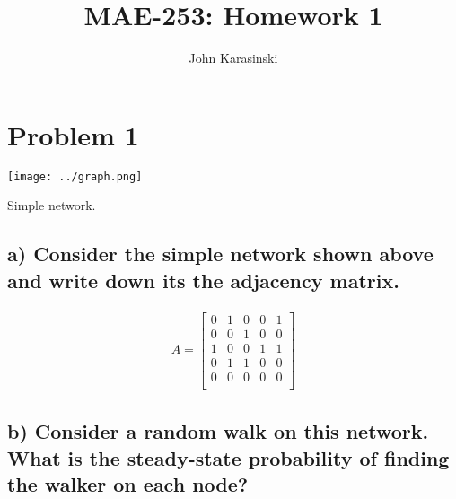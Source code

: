 \documentclass{tufte-handout}
\begin{document}
\title{MAE-253: Homework 1}
\author[John Karasinski]{John Karasinski}
\maketitle%

\section{Problem 1}

\begin{marginfigure}%
  \texttt{[image: ../graph.png]}
  \caption{Simple network.}
\end{marginfigure}

\subsection{a)
Consider the simple network shown above and write down its the adjacency matrix.}

\begin{align*}
A =
\begin{bmatrix}
  0 & 1 & 0 & 0 & 1 \\
  0 & 0 & 1 & 0 & 0 \\
  1 & 0 & 0 & 1 & 1 \\
  0 & 1 & 1 & 0 & 0 \\
  0 & 0 & 0 & 0 & 0 \\
\end{bmatrix}
\end{align*}

\subsection{b)
Consider a random walk on this network. What is the steady-state probability of finding the walker on each node?}
\end{document}
